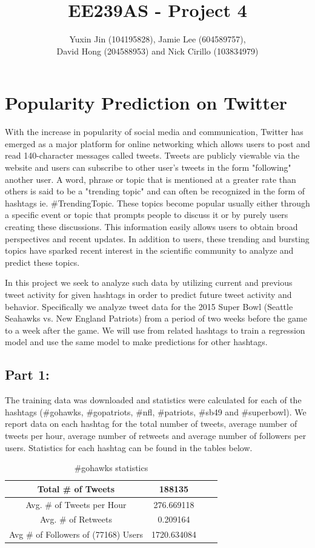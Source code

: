 \documentclass[12pt]{article}
\title{EE239AS - Project 4}
\author{Yuxin Jin (104195828), Jamie Lee (604589757),\\ David Hong (204588953) and Nick Cirillo (103834979)}
\begin{document}
\maketitle


\section{Popularity Prediction on Twitter}

With the increase in popularity of social media and communication, Twitter has emerged as a major platform for online networking which allows users to post and read 140-character messages called tweets. Tweets are publicly viewable via the website and users can subscribe to other user's tweets in the form "following" another user. A word, phrase or topic that is mentioned at a greater rate than others is said to be a "trending topic" and can often be recognized in the form of hashtags ie. \#TrendingTopic. These topics  become popular usually either through a specific event or topic that prompts people to discuss it or by purely users creating these discussions. This information easily allows users to obtain broad perspectives and recent updates. In addition to users, these trending and bursting topics have sparked recent interest in the scientific community to analyze and predict these topics.

In this project we seek to analyze such data by utilizing current and previous tweet activity for given hashtags in order to predict future tweet activity and behavior. Specifically we analyze tweet data for the 2015 Super Bowl (Seattle Seahawks vs. New England Patriots) from a period of two weeks before the game to a week after the game. We will use from related hashtags to train a regression model and use the same model to make predictions for other hashtags.


\subsection{Part 1:}

The training data was downloaded and statistics were calculated for each of the hashtags (\#gohawks, \#gopatriots, \#nfl, \#patriots, \#sb49 and \#superbowl). We report data on each hashtag for the total number of tweets, average number of tweets per hour, average number of retweets and average number of followers per users. Statistics for each hashtag can be found in the tables below.

\begin{table}[h]
	\centering
	\begin{tabular}{| c | c | c | c |}
		\hline 
		Total \# of Tweets & 188135 \\\hline
		Avg. \# of Tweets per Hour & 276.669118 \\\hline
		Avg. \# of Retweets & 0.209164 \\\hline
		Avg \# of Followers of (77168) Users & 1720.634084 \\\hline
	\end{tabular} 
	\caption{\#gohawks statistics}
	\label{part1:tab1}
\end{table} 
\end{document}
